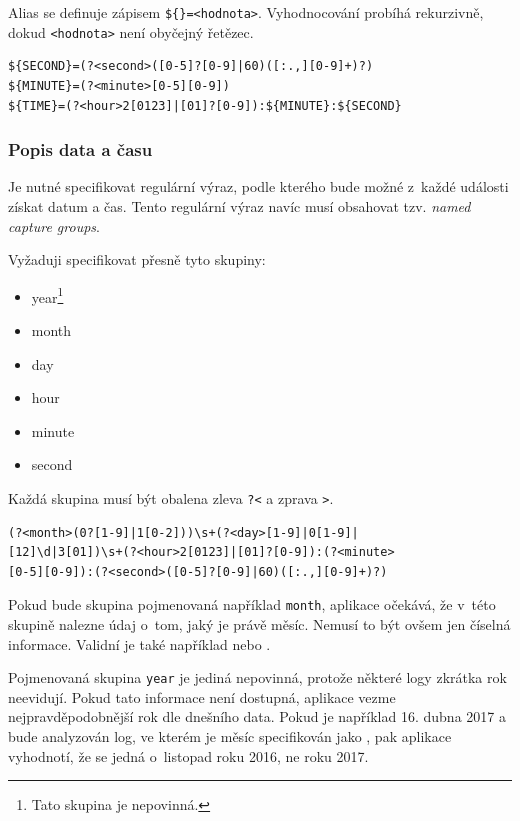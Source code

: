 \documentclass[a4paper,12pt]{article}
\begin{document}
Alias se definuje zápisem \texttt{\$\{<jmémo proměnné>\}=<hodnota>}. Vyhodnocování probíhá rekurzivně, dokud \texttt{<hodnota>} není obyčejný řetězec.
\newpage

\begin{lstlisting}[frame=single,caption=Příklad definice tří aliasů, label=aliasExample]
${SECOND}=(?<second>([0-5]?[0-9]|60)([:.,][0-9]+)?)
${MINUTE}=(?<minute>[0-5][0-9])
${TIME}=(?<hour>2[0123]|[01]?[0-9]):${MINUTE}:${SECOND}
\end{lstlisting}

\subsubsection{Popis data a času}
\label{namedCaptureGroups}
Je nutné specifikovat regulární výraz, podle kterého bude možné z~každé události získat datum a čas. Tento regulární výraz navíc musí obsahovat tzv. \textit{named capture groups}. \cite{namedCaptureGroups}

Vyžaduji specifikovat přesně tyto skupiny:
\begin{itemize}
	\item year\footnote{Tato skupina je nepovinná.}
	\item month
	\item day
	\item hour
	\item minute
	\item second
\end{itemize}

Každá skupina musí být obalena zleva \texttt{?<} a zprava \texttt{>}.

\begin{lstlisting}[frame=single,caption=Příklad regulárního výrazu získávájící datum a čas z~události, label=regExpExample]
(?<month>(0?[1-9]|1[0-2]))\s+(?<day>[1-9]|0[1-9]|
[12]\d|3[01])\s+(?<hour>2[0123]|[01]?[0-9]):(?<minute>
[0-5][0-9]):(?<second>([0-5]?[0-9]|60)([:.,][0-9]+)?)
\end{lstlisting}

Pokud bude skupina pojmenovaná například \texttt{month}, aplikace očekává, že v~této skupině nalezne údaj o~tom, jaký je právě měsíc. Nemusí to být ovšem jen číselná informace. Validní je také například  nebo . 

Pojmenovaná skupina \texttt{year} je jediná nepovinná, protože některé logy zkrátka rok neevidují. Pokud tato informace není dostupná, aplikace vezme nejpravděpodobnější rok dle dnešního data. Pokud je například 16. dubna 2017 a bude analyzován log, ve kterém je měsíc specifikován jako , pak aplikace vyhodnotí, že se jedná o~listopad roku 2016, ne roku 2017.
\end{document}

